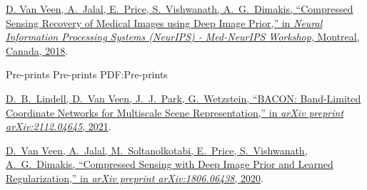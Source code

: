\Gap
\NumberedItem{[C1]}
\href{https://www.doc.ic.ac.uk/~bglocker/public/mednips2018/med-nips_2018_paper_56.pdf}
{\underline{D. Van Veen}, A.~Jalal, E.~Price, S.~Vishwanath, A.~G.~Dimakis,
``Compressed Sensing Recovery of Medical Images using Deep Image Prior,''
in \textit{Neural Information Processing Systems (NeurIPS) - Med-NeurIPS Workshop}, Montreal, Canada, 2018}.

\endgroup

\BigGap
\SubSection
{Pre-prints}
{Pre-prints}
{PDF:Pre-prints}

\begingroup

\Gap
\NumberedItem{[P2]}
\href{https://arxiv.org/pdf/2112.04645.pdf}
{D.~B.~Lindell, \underline{D.~Van Veen}, J.~J.~Park, G.~Wetzstein,
``BACON: Band-Limited Coordinate Networks for Multiscale Scene Representation,''
in \textit{arXiv preprint arXiv:2112.04645}, 2021}.

\Gap
\NumberedItem{[P1]}
\href{https://arxiv.org/pdf/1806.06438.pdf}
{\underline{D.~Van Veen}, A.~Jalal, M.~Soltanolkotabi, E.~Price, S.~Vishwanath, A.~G.~Dimakis,
``Compressed Sensing with Deep Image Prior and Learned Regularization,''
in \textit{arXiv preprint arXiv:1806.06438}, 2020}.

\endgroup